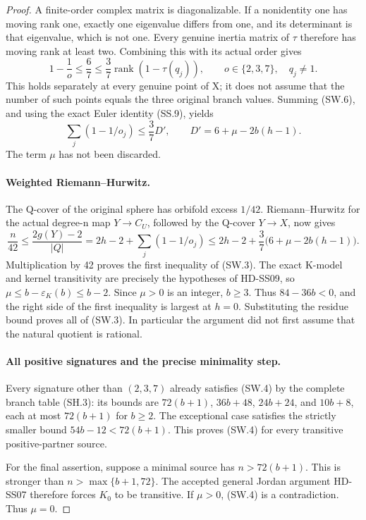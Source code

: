 \begin{proof}
A finite-order complex matrix is diagonalizable.  If a nonidentity
one has moving rank one, exactly one eigenvalue differs from one,
and its determinant is that eigenvalue, which is not one.
Every genuine inertia matrix of \(\tau\) therefore has moving
rank at least two.  Combining this with its actual order gives
\[
 1-\frac1o\le\frac67
       \le\frac37\operatorname{rank}(1-\tau(q_j)),
 \qquad o\in\{2,3,7\},\quad q_j\ne1.
 \tag{SW.6}
\]
This holds separately at every genuine point of X; it does not
assume that the number of such points equals the three original
branch values.  Summing (SW.6), and using the exact Euler identity
(SS.9), yields
\[
 \sum_j(1-1/o_j)\le\frac37D',\qquad
 D'=6+\mu-2b(h-1).
 \tag{SW.7}
\]
The term \(\mu\) has not been discarded.

\paragraph{Weighted Riemann--Hurwitz.}
The Q-cover of the original sphere has orbifold excess
\(1/42\).  Riemann--Hurwitz for the actual degree-n map
\(Y\to C_U\), followed by the Q-cover \(Y\to X\), now gives
\[
 \frac n{42}
 \le\frac{2g(Y)-2}{|Q|}
 =2h-2+\sum_j(1-1/o_j)
 \le2h-2+\frac37\bigl(6+\mu-2b(h-1)\bigr).
 \tag{SW.8}
\]
Multiplication by 42 proves the first inequality of (SW.3).
The exact K-model and kernel transitivity are precisely the
hypotheses of HD-SS09, so
\(\mu\le b-\varepsilon_K(b)\le b-2\).
Since \(\mu>0\) is an integer, \(b\ge3\).  Thus
\(84-36b<0\), and the right side of the first inequality is
largest at \(h=0\).  Substituting the residue bound proves all
of (SW.3).  In particular the argument did not first assume that
the natural quotient is rational.

\paragraph{All positive signatures and the precise minimality step.}
Every signature other than \((2,3,7)\) already satisfies
(SW.4) by the complete branch table (SH.3): its bounds are
\(72(b+1)\), \(36b+48\), \(24b+24\), and \(10b+8\),
each at most \(72(b+1)\) for \(b\ge2\).
The exceptional case satisfies the strictly smaller bound
\(54b-12<72(b+1)\).  This proves (SW.4) for every transitive
positive-partner source.

For the final assertion, suppose a minimal source has
\(n>72(b+1)\).  This is stronger than
\(n>\max\{b+1,72\}\).  The accepted general Jordan argument
HD-SS07 therefore forces \(K_0\) to be transitive.  If \(\mu>0\),
(SW.4) is a contradiction.  Thus \(\mu=0\).


\end{proof}
